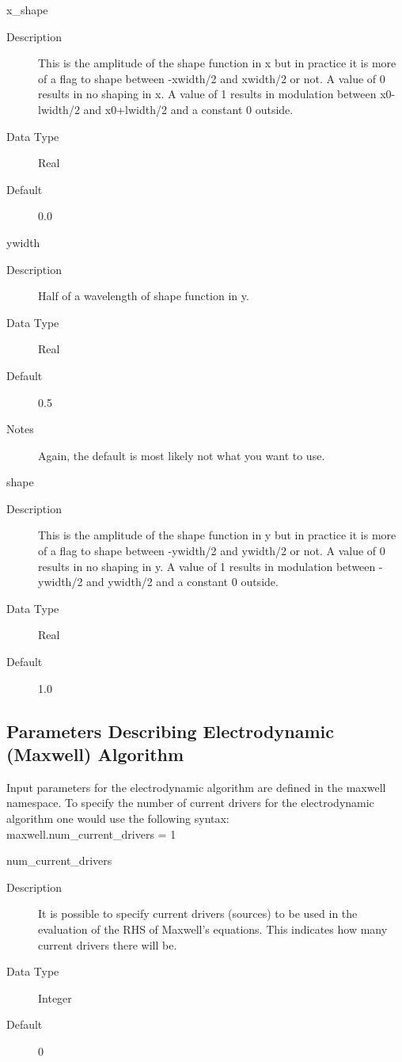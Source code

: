 \documentclass[11pt]{amsart}
\begin{document}
x\_shape
\begin{description}
\item [Description] This is the amplitude of the shape function in x but in
practice it is more of a flag to shape between -xwidth/2 and xwidth/2 or
not.  A value of 0 results in no shaping in x.  A value of 1 results in
modulation between x0-lwidth/2 and x0+lwidth/2 and a constant 0 outside.
\item [Data Type] Real
\item [Default] 0.0
\end{description}

ywidth
\begin{description}
\item [Description] Half of a wavelength of shape function in y.
\item [Data Type] Real
\item [Default] 0.5
\item [Notes] Again, the default is most likely not what you want to use.
\end{description}

shape
\begin{description}
\item [Description] This is the amplitude of the shape function in y but in
practice it is more of a flag to shape between -ywidth/2 and ywidth/2 or
not.  A value of 0 results in no shaping in y.  A value of 1 results in
modulation between -ywidth/2 and ywidth/2 and a constant 0 outside.
\item [Data Type] Real
\item [Default] 1.0
\end{description}

\subsection*{Parameters Describing Electrodynamic (Maxwell) Algorithm}
Input parameters for the electrodynamic algorithm are defined in the maxwell
namespace.  To specify the number of current drivers for the electrodynamic
algorithm one would use the following syntax: \\
maxwell.num\_current\_drivers = 1

num\_current\_drivers
\begin{description}
\item [Description] It is possible to specify current drivers (sources) to be
used in the evaluation of the RHS of Maxwell's equations.  This indicates
how many current drivers there will be.
\item [Data Type] Integer
\item [Default] 0
\end{description}
\end{document}
